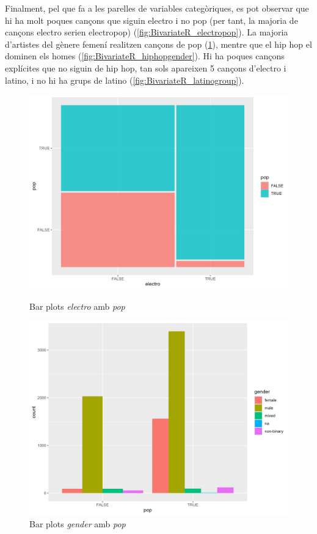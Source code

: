 Finalment, pel que fa a les parelles de variables categòriques, es pot observar que hi ha molt poques cançons que siguin electro i no pop (per tant, la majoria de cançons electro serien electropop) (\ref{fig:BivariateR_electropop}). La majoria d'artistes del gènere femení realitzen cançons de pop (\ref{fig:BivariateR_popgender}), mentre que el hip hop el dominen els homes (\ref{fig:BivariateR_hiphopgender}). Hi ha poques cançons explícites que no siguin de hip hop, tan sols apareixen 5 cançons d'electro i latino, i no hi ha grups de latino (\ref{fig:BivariateR_latinogroup}).

\begin{figure}[H]
\centering
    \begin{minipage}{.4\textwidth}
        \centering
        \includegraphics[width=0.95\linewidth]{Images/2_Bivariate/electropop.png}
        \caption{Bar plots \textit{electro} amb \textit{pop}}
        \label{fig:BivariateR_electropop}
    \end{minipage}%
    \begin{minipage}{.4\textwidth}
        \centering
        \includegraphics[width=0.95\linewidth]{Images/2_Bivariate/popgender.png}
        \caption{Bar plots \textit{gender} amb \textit{pop}}
        \label{fig:BivariateR_popgender}
    \end{minipage}%
\end{figure}
